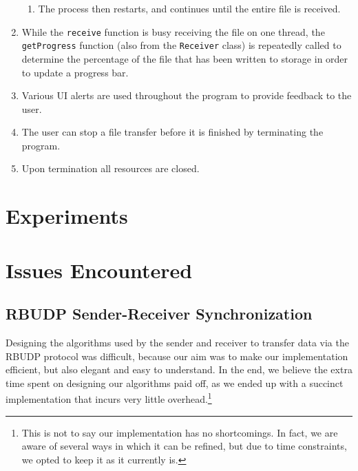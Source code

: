 \documentclass[10pt, a4paper]{article}
\begin{document}
\begin{enumerate}
\begin{enumerate}
      \item The process then restarts, and continues until the entire file is
        received.
    \end{enumerate}
  \item While the \texttt{receive} function is busy receiving the file on one
    thread, the \texttt{getProgress} function (also from the \texttt{Receiver}
    class) is repeatedly called to determine the percentage of the file that
    has been written to storage in order to update a progress bar.
  \item Various UI alerts are used throughout the program to provide feedback to
    the user.
  \item The user can stop a file transfer before it is finished by terminating
    the program.
  \item Upon termination all resources are closed.
\end{enumerate}


\section{Experiments}
\label{sec:exp}


\section{Issues Encountered}
\label{sec:issues}

\subsection{RBUDP Sender-Receiver Synchronization}
\label{subsec:send-recv-sync}

Designing the algorithms used by the sender and receiver to transfer data via
the RBUDP protocol was difficult, because our aim was to make our implementation
efficient, but also elegant and easy to understand. In the end, we believe the
extra time spent on designing our algorithms paid off, as we ended up with a
succinct implementation that incurs very little overhead.\footnote{This is not
to say our implementation has no shortcomings. In fact, we are aware of several
ways in which it can be refined, but due to time constraints, we opted to keep
it as it currently is.}
\end{document}
